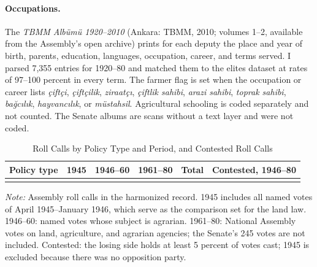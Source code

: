 \paragraph{Occupations.} The \textit{TBMM Albümü 1920--2010} (Ankara: TBMM, 2010; volumes 1--2, available from the Assembly's open archive) prints for each deputy the place and year of birth, parents, education, languages, occupation, career, and terms served. I parsed 7,355 entries for 1920--80 and matched them to the elites dataset at rates of 97--100 percent in every term. The farmer flag is set when the occupation or career lists \textit{çiftçi}, \textit{çiftçilik}, \textit{ziraatçı}, \textit{çiftlik sahibi}, \textit{arazi sahibi}, \textit{toprak sahibi}, \textit{bağcılık}, \textit{hayvancılık}, or \textit{müstahsil}. Agricultural schooling is coded separately and not counted. The Senate albums are scans without a text layer and were not coded.

\begin{table}[H]
\centering
\begin{threeparttable}
\caption{Roll Calls by Policy Type and Period, and Contested Roll Calls}
\label{tab:A1}
\small
\begin{tabular}{L{7.0cm}rrrrr}
\toprule
Policy type & 1945 & 1946--60 & 1961--80 & Total & Contested, 1946--80 \\
\midrule
{}
\bottomrule
\end{tabular}
\begin{tablenotes}\footnotesize
\item \textit{Note:} Assembly roll calls in the harmonized record. 1945 includes all named votes of April 1945--January 1946, which serve as the comparison set for the land law. 1946--60: named votes whose subject is agrarian. 1961--80: National Assembly votes on land, agriculture, and agrarian agencies; the Senate's 245 votes are not included. Contested: the losing side holds at least 5 percent of votes cast; 1945 is excluded because there was no opposition party.
\end{tablenotes}
\end{threeparttable}
\end{table}

